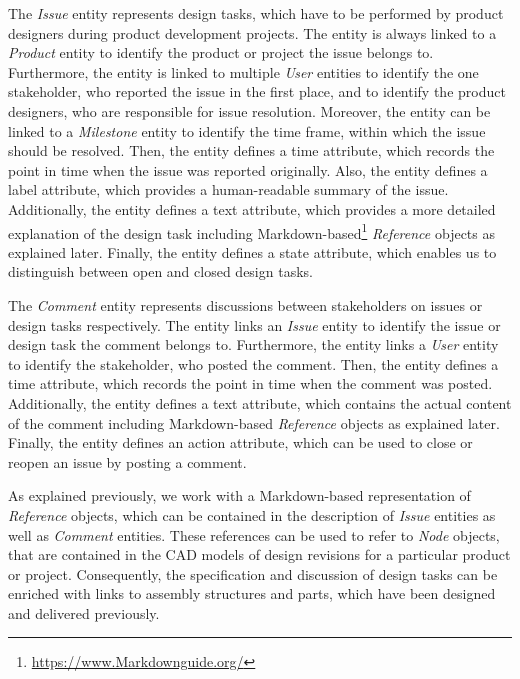 The \textit{Issue} entity represents design tasks, which have to be performed by product designers during product development projects.
The entity is always linked to a \textit{Product} entity to identify the product or project the issue belongs to.
Furthermore, the entity is linked to multiple \textit{User} entities to identify the one stakeholder, who reported the issue in the first place, and to identify the product designers, who are responsible for issue resolution.
Moreover, the entity can be linked to a \textit{Milestone} entity to identify the time frame, within which the issue should be resolved.
Then, the entity defines a time attribute, which records the point in time when the issue was reported originally.
Also, the entity defines a label attribute, which provides a human-readable summary of the issue.
Additionally, the entity defines a text attribute, which provides a more detailed explanation of the design task including Markdown-based\footnote{\url{https://www.Markdownguide.org/}} \textit{Reference} objects as explained later.
Finally, the entity defines a state attribute, which enables us to distinguish between open and closed design tasks.

The \textit{Comment} entity represents discussions between stakeholders on issues or design tasks respectively.
The entity links an \textit{Issue} entity to identify the issue or design task the comment belongs to.
Furthermore, the entity links a \textit{User} entity to identify the stakeholder, who posted the comment.
Then, the entity defines a time attribute, which records the point in time when the comment was posted.
Additionally, the entity defines a text attribute, which contains the actual content of the comment including Markdown-based \textit{Reference} objects as explained later.
Finally, the entity defines an action attribute, which can be used to close or reopen an issue by posting a comment.

As explained previously, we work with a Markdown-based representation of \textit{Reference} objects, which can be contained in the description of \textit{Issue} entities as well as \textit{Comment} entities.
These references can be used to refer to \textit{Node} objects, that are contained in the CAD models of design revisions for a particular product or project.
Consequently, the specification and discussion of design tasks can be enriched with links to assembly structures and parts, which have been designed and delivered previously.